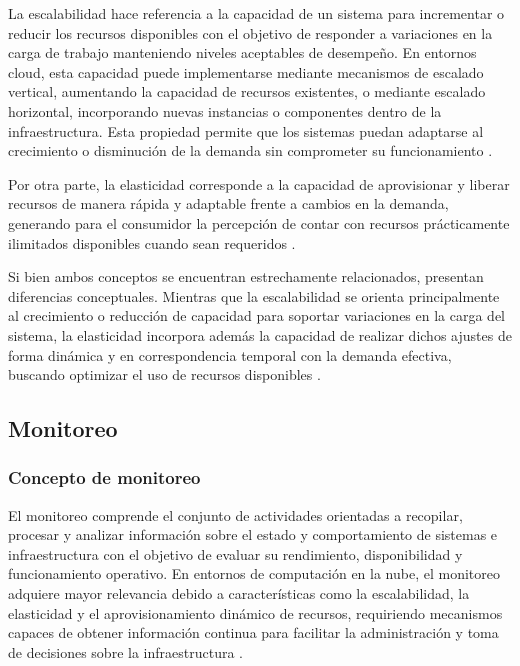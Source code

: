 La escalabilidad hace referencia a la capacidad de un sistema para incrementar o reducir los recursos disponibles con el objetivo de responder a variaciones en la carga de trabajo manteniendo niveles aceptables de desempeño. En entornos cloud, esta capacidad puede implementarse mediante mecanismos de escalado vertical, aumentando la capacidad de recursos existentes, o mediante escalado horizontal, incorporando nuevas instancias o componentes dentro de la infraestructura. Esta propiedad permite que los sistemas puedan adaptarse al crecimiento o disminución de la demanda sin comprometer su funcionamiento \parencite{Ullah2018}.

Por otra parte, la elasticidad corresponde a la capacidad de aprovisionar y liberar recursos de manera rápida y adaptable frente a cambios en la demanda, generando para el consumidor la percepción de contar con recursos prácticamente ilimitados disponibles cuando sean requeridos \parencite{Mell2011}.

Si bien ambos conceptos se encuentran estrechamente relacionados, presentan diferencias conceptuales. Mientras que la escalabilidad se orienta principalmente al crecimiento o reducción de capacidad para soportar variaciones en la carga del sistema, la elasticidad incorpora además la capacidad de realizar dichos ajustes de forma dinámica y en correspondencia temporal con la demanda efectiva, buscando optimizar el uso de recursos disponibles \parencite{Ullah2018, Mell2011}.

\subsection{Monitoreo}

\subsubsection{Concepto de monitoreo}

El monitoreo comprende el conjunto de actividades orientadas a recopilar, procesar y analizar información sobre el estado y comportamiento de sistemas e infraestructura con el objetivo de evaluar su rendimiento, disponibilidad y funcionamiento operativo. En entornos de computación en la nube, el monitoreo adquiere mayor relevancia debido a características como la escalabilidad, la elasticidad y el aprovisionamiento dinámico de recursos, requiriendo mecanismos capaces de obtener información continua para facilitar la administración y toma de decisiones sobre la infraestructura \parencite{Ward2014}.


